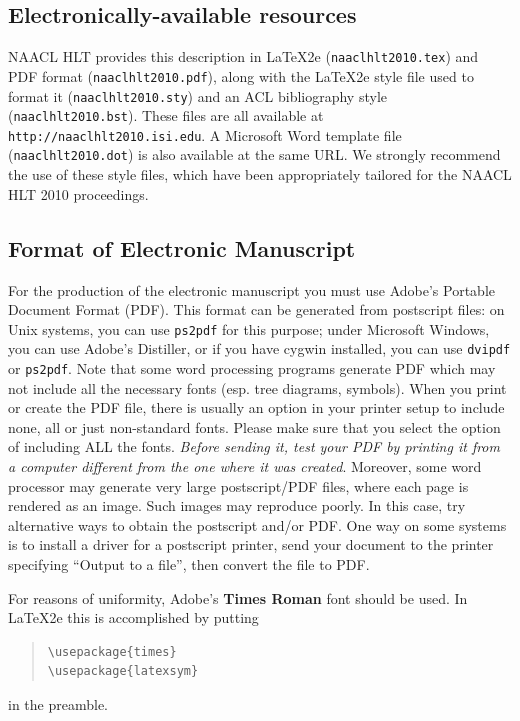 \documentclass[11pt,letterpaper]{article}
\begin{document}
\subsection{Electronically-available resources}

NAACL HLT provides this description in \LaTeX2e{} ({\tt naaclhlt2010.tex}) and PDF
format ({\tt naaclhlt2010.pdf}), along with the \LaTeX2e{} style file used to
format it ({\tt naaclhlt2010.sty}) and an ACL bibliography style ({\tt naaclhlt2010.bst}).
These files are all available at
{\tt http://naaclhlt2010.isi.edu}.  A Microsoft Word
template file ({\tt naaclhlt2010.dot}) is also available at the same URL. We
strongly recommend the use of these style files, which have been
appropriately tailored for the NAACL HLT 2010 proceedings.


\subsection{Format of Electronic Manuscript}
\label{sect:pdf}

For the production of the electronic manuscript you must use Adobe's
Portable Document Format (PDF). This format can be generated from
postscript files: on Unix systems, you can use {\tt ps2pdf} for this
purpose; under Microsoft Windows, you can use Adobe's Distiller, or
if you have cygwin installed, you can use {\tt dvipdf} or
{\tt ps2pdf}.  Note 
that some word processing programs generate PDF which may not include
all the necessary fonts (esp. tree diagrams, symbols). When you print
or create the PDF file, there is usually an option in your printer
setup to include none, all or just non-standard fonts.  Please make
sure that you select the option of including ALL the fonts.  {\em
  Before sending it, test your {\/\em PDF} by printing it from a
  computer different from the one where it was created}. Moreover,
some word processor may generate very large postscript/PDF files,
where each page is rendered as an image. Such images may reproduce
poorly.  In this case, try alternative ways to obtain the postscript
and/or PDF.  One way on some systems is to install a driver for a
postscript printer, send your document to the printer specifying
``Output to a file'', then convert the file to PDF.

For reasons of uniformity, Adobe's {\bf Times Roman} font should be
used. In \LaTeX2e{} this is accomplished by putting

\begin{quote}
\begin{verbatim}
\usepackage{times}
\usepackage{latexsym}
\end{verbatim}
\end{quote}
in the preamble.
\end{document}
